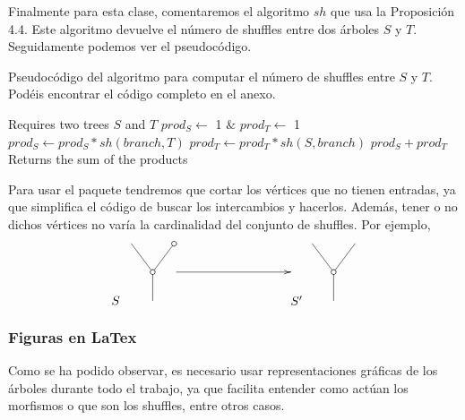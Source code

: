 \documentclass[../main.tex]{subfiles}
\begin{document}
Finalmente para esta clase, comentaremos el algoritmo $sh$ que usa la Proposici\'on 4.4. Este algoritmo devuelve el n\'umero de shuffles entre dos \'arboles $S$ y $T$. Seguidamente podemos ver el pseudoc\'odigo.
\begin{algoritmo}
    \caption{Pseudoc\'odigo del algoritmo para computar el n\'umero de shuffles entre $S$ y $T$. Pod\'eis encontrar el c\'odigo completo en el anexo.}
    \begin{algorithmic}[1]
        \Require Requires two trees $S$ and $T$
        \EndIf
        \State $prod_S\leftarrow$ 1 $\&$ $prod_T\leftarrow$ 1
        \State $prod_S \leftarrow prod_S * sh(branch, T)$ 
        \EndFor
        \State $prod_T \leftarrow prod_T * sh(S, branch)$ 
        \EndFor
        \State\Return $prod_S+prod_T$
        \EndFunction
        \Ensure Returns the sum of the products
    \end{algorithmic}
\end{algoritmo}

\begin{obs}
    Para usar el paquete tendremos que cortar los v\'ertices que no tienen entradas, ya que simplifica el c\'odigo de buscar los intercambios y hacerlos. Adem\'as, tener o no dichos v\'ertices no var\'ia la cardinalidad del conjunto de shuffles. Por ejemplo,
    $$
        \xy
        <0.08cm, 0cm>:
        (0.0, 0.0)*{}="1"; %
        (0.0, 10.0)*\cir<2pt>{}="2"; %
        (-7.5, 20.0)*{}="3"; %
        (7.5, 20.0)*\cir<2pt>{}="4"; %
        "1";"2" **\dir{-};
        "2";"3" **\dir{-};
        "2";"4" **\dir{-};
        (-13,0)*{S};
        \endxy
        \xy
        <0.08cm, 0cm>:
        (-20, 0.0)*{}="1";
        (20, 10.0)*{}="2";
        {\ar(-20, 10)*{};(20,10)*{}};
        \endxy
        \xy
        <0.08cm, 0cm>:
        (0.0, 0.0)*{}="1"; %
        (0.0, 10.0)*\cir<2pt>{}="2"; %
        (-7.5, 20.0)*{}="3"; %
        (7.5, 20.0)*{}="4"; %
        "1";"2" **\dir{-};
        "2";"3" **\dir{-};
        "2";"4" **\dir{-};
        (-13,0)*{S'};
        \endxy
    $$
\end{obs}

\subsubsection*{Figuras en LaTex}
Como se ha podido observar, es necesario usar representaciones gr\'aficas de los \'arboles durante todo el trabajo, ya que facilita entender como act\'uan los morfismos o que son los shuffles, entre otros casos.
\end{document}
